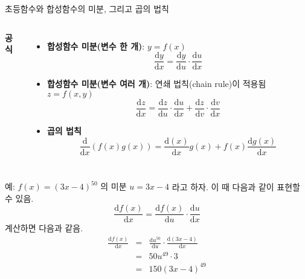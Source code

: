 \documentclass[10pt,t]{beamer}
\begin{document}
\begin{frame}{초등함수와 합성함수의 미분, 그리고 곱의 법칙}
\begin{columns}
\textbf{공식}
\begin{itemize}
    \item \textbf{합성함수 미분(변수 한 개)}: $y=f(x)$ \[\frac{\text{d}y}{\text{d}x} = \frac{\text{d}y}{\text{d}u}\cdot \frac{\text{d}u}{\text{d}x}  \]
    \item \textbf{합성함수 미분(변수 여러 개)}: 연쇄 법칙(chain rule)이 적용됨 $z=f(x,y)$ \[\frac{\text{d}z}{\text{d}x} = \frac{\text{d}z}{\text{d}u}\cdot \frac{\text{d}u}{\text{d}x} + \frac{\text{d}z}{\text{d}v}\cdot \frac{\text{d}v}{\text{d}x} \]
    \item \textbf{곱의 법칙}  \[\frac{\text{d}}{\text{d}x}\left(f(x)g(x)\right) = \frac{\text{d}(x)}{\text{d}x}g(x) + f(x)\frac{\text{d}g(x)}{\text{d}x} \]
\end{itemize}
\end{columns}

\pagebreak
\begin{block}{예: $f(x)=(3x-4)^{50}$ 의 미분} 
    $u=3x-4$ 라고 하자. 이 때 다음과 같이 표현할 수 있음.
    \[\frac{\text{d}f(x)}{\text{d}x}=\frac{\text{d}f(x)}{\text{d}u} \cdot \frac{\text{d}u}{\text{d}x} \]
    계산하면 다음과 같음.
    \begin{eqnarray*}
        \frac{\text{d}f(x)}{\text{d}x}&=& \frac{\text{d}u^{50}}{\text{d}u} \cdot \frac{\text{d}(3x-4)}{\text{d}x}\\
        &=& 50u^{49} \cdot 3\\
        &=& 150 (3x-4 )^{49}   
    \end{eqnarray*}
\end{block}

\end{frame}
\end{document}
